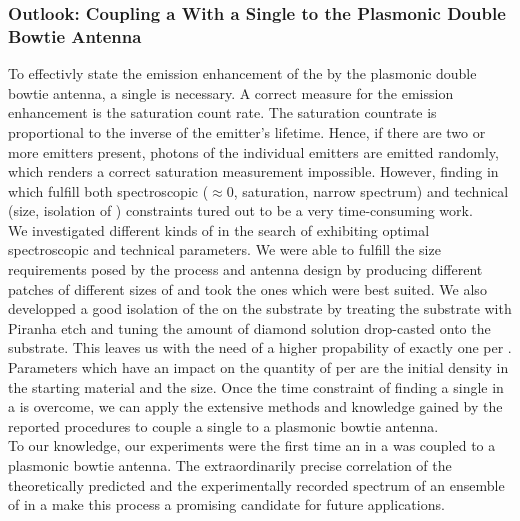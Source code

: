 		\subsubsection{Outlook: Coupling a \Nd With a Single \Siv to the Plasmonic Double Bowtie Antenna}
			To effectivly state the emission enhancement of the \siv by the plasmonic double bowtie antenna, a single \siv is necessary.
			A correct measure for the emission enhancement is the saturation count rate.
			The saturation countrate is proportional to the inverse of the emitter's lifetime.
			Hence, if there are two or more emitters present, photons of the individual emitters are emitted randomly, which renders a correct saturation measurement impossible.
			However, finding \sivs in \nds which fulfill both spectroscopic (\gtz $\approx$0, saturation, narrow \ZPL spectrum) and technical (size, isolation of \nds) constraints tured out to be a very time-consuming work.
			\\
			We investigated different kinds of \nds in the search of \nds exhibiting optimal spectroscopic and technical parameters.
			We were able to fulfill the size requirements posed by the \pp process and antenna design by producing different patches of different sizes of \nds and took the ones which were best suited.
			We also developped a good isolation of the \nds on the substrate by treating the \ir substrate with Piranha etch and tuning the amount of diamond solution drop-casted onto the substrate.
			This leaves us with the need of a higher propability of exactly one \siv per \nd.
			Parameters which have an impact on the quantity of \sivs per \nd are the initial \siv density in the starting material and the \nd size.
			Once the time constraint of finding a single \siv in a \nd is overcome, we can apply the extensive methods and knowledge gained by the reported procedures to couple a single \siv to a plasmonic bowtie antenna.
			\\
			To our knowledge, our experiments were the first time an \siv in a \nd was coupled to a plasmonic bowtie antenna.
			The extraordinarily precise correlation of the theoretically predicted and the experimentally recorded spectrum of an ensemble of \sivs in a \nd make this process a promising candidate for future applications.

